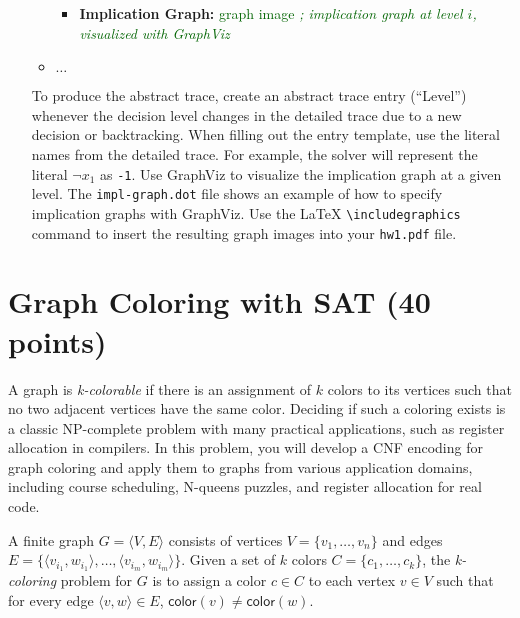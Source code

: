 \documentclass{article}
\begin{document}
\begin{enumerate}
\begin{itemize}
\begin{itemize}
			\item \textbf{Implication Graph:} \textcolor{DarkGreen}{graph image} \hfill{\textcolor{DarkGreen}{\emph{; implication graph at level $i$, visualized with GraphViz}}}

		\end{itemize}
		\item $\ldots$
	\end{itemize}

	To produce the abstract trace, create an abstract trace  entry (``Level'') whenever the decision level changes in the detailed trace due to a new decision or backtracking. When filling out the entry template, use the literal names from the detailed trace. For example, the solver will represent the literal $\neg x_1$ as \texttt{-1}. Use GraphViz to visualize the implication graph at a given level. The \texttt{impl-graph.dot} file shows an example of how to specify implication graphs with GraphViz. Use the LaTeX \texttt{\textbackslash includegraphics} command to insert the resulting graph images into your \texttt{hw1.pdf} file.





\end{enumerate}

\section{Graph Coloring with SAT (40 points)}\label{coloring}

A graph is \emph{k-colorable} if there is an assignment of $k$ colors to its vertices such that no two adjacent vertices have the same color.  Deciding if such a coloring exists is a classic NP-complete problem with many practical applications, such as register allocation in compilers.  In this problem, you will develop a CNF encoding for graph coloring and apply them to graphs from various application domains, including course scheduling, N-queens puzzles, and register allocation for real code.

A finite graph $G = \langle V, E\rangle$ consists of vertices $V=\{v_1,\ldots,v_n\}$ and edges $E=\{\langle v_{i_1}, w_{i_1}\rangle,\ldots,\langle v_{i_m}, w_{i_m}\rangle\}$.  Given a set of $k$ colors $C=\{c_1,\ldots,c_k\}$, the \emph{k-coloring} problem for $G$ is to assign a color $c\in C$  to each vertex $v\in V$ such that for every edge $\langle v,w\rangle\in E$, $\mathsf{color}(v)\neq\mathsf{color}(w)$.
\end{document}
